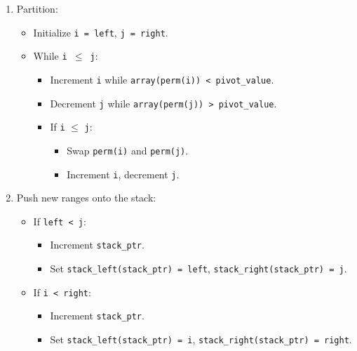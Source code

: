 \documentclass{article}
\begin{document}
\begin{enumerate}
\begin{itemize}
\begin{enumerate}
            \item Partition:
            \begin{itemize}
                \item Initialize \texttt{i = left}, \texttt{j = right}.
                \item While \texttt{i $\leq$ j}:
                \begin{itemize}
                    \item Increment \texttt{i} while \texttt{array(perm(i)) < pivot\_value}.
                    \item Decrement \texttt{j} while \texttt{array(perm(j)) > pivot\_value}.
                    \item If \texttt{i} \(\leq\) \texttt{j}:
                    \begin{itemize}
                        \item Swap \texttt{perm(i)} and \texttt{perm(j)}.
                        \item Increment \texttt{i}, decrement \texttt{j}.
                    \end{itemize}
                \end{itemize}
            \end{itemize}
            
            \item Push new ranges onto the stack:
            \begin{itemize}
                \item If \texttt{left < j}:
                \begin{itemize}
                    \item Increment \texttt{stack\_ptr}.
                    \item Set \texttt{stack\_left(stack\_ptr) = left}, \texttt{stack\_right(stack\_ptr) = j}.
                \end{itemize}
                \item If \texttt{i < right}:
                \begin{itemize}
                    \item Increment \texttt{stack\_ptr}.
                    \item Set \texttt{stack\_left(stack\_ptr) = i}, \texttt{stack\_right(stack\_ptr) = right}.
                \end{itemize}
            \end{itemize}
        \end{enumerate}
    \end{itemize}
\end{enumerate}
\end{document}
